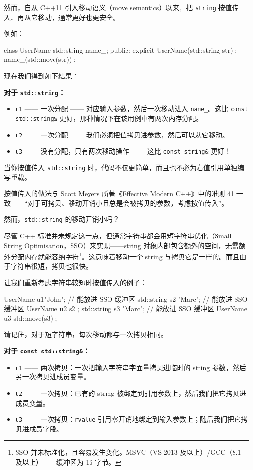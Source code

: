 然而，自从 C++11 引入移动语义（move semantics）以来，把 \texttt{string} 按值传入、再从它移动，通常更好也更安全。

例如：

\begin{codebox}[cpp]
class UserName {
std::string name_;
public:
explicit UserName(std::string str) : name_(std::move(str)) { }
};
\end{codebox}

现在我们得到如下结果：

\textbf{对于 \texttt{std::string}：}

\begin{itemize}
\item \texttt{u1} —— 一次分配 —— 对应输入参数，然后一次移动进入 \texttt{name\_}。这比 \texttt{const std::string\&} 更好，那种情况下在该用例中有两次内存分配。
\item \texttt{u2} —— 一次分配 —— 我们必须把值拷贝进参数，然后可以从它移动。
\item \texttt{u3} —— 没有分配，只有两次移动操作 —— 这比 \texttt{const string\&} 更好！
\end{itemize}

当你按值传入 \texttt{std::string} 时，代码不仅更简单，而且也不必为右值引用单独编写重载。

按值传入的做法与 Scott Meyers 所著《Effective Modern C++》中的准则 41 一致——“对于可拷贝、移动开销小且总是会被拷贝的参数，考虑按值传入”。

然而，\texttt{std::string} 的移动开销小吗？

尽管 C++ 标准并未规定这一点，但通常字符串都会用短字符串优化（Small String Optimisation，SSO）来实现——string 对象内部包含额外的空间，无需额外分配内存就能容纳字符\footnote{SSO 并未标准化，且容易发生变化。MSVC（VS 2013 及以上）/GCC（8.1 及以上）——缓冲区为 16 字节。}。这意味着移动一个 string 与拷贝它是一样的。而且由于字符串很短，拷贝也很快。

让我们重新考虑字符串较短时按值传入的例子：

\begin{codebox}[cpp]
UserName u1{"John"}; // 能放进 SSO 缓冲区
std::string s2 {"Marc"}; // 能放进 SSO 缓冲区
UserName u2 { s2 };
std::string s3 {"Marc"}; // 能放进 SSO 缓冲区
UserName u3 { std::move(s3) };
\end{codebox}

请记住，对于短字符串，每次移动都与一次拷贝相同。

\textbf{对于 \texttt{const std::string\&}：}

\begin{itemize}
\item \texttt{u1} —— 两次拷贝：一次把输入字符串字面量拷贝进临时的 string 参数，然后另一次拷贝进成员变量。
\item \texttt{u2} —— 一次拷贝：已有的 string 被绑定到引用参数上，然后我们把它拷贝进成员变量。
\item \texttt{u3} —— 一次拷贝：\texttt{rvalue} 引用零开销地绑定到输入参数上；随后我们把它拷贝进成员字段。
\end{itemize}

